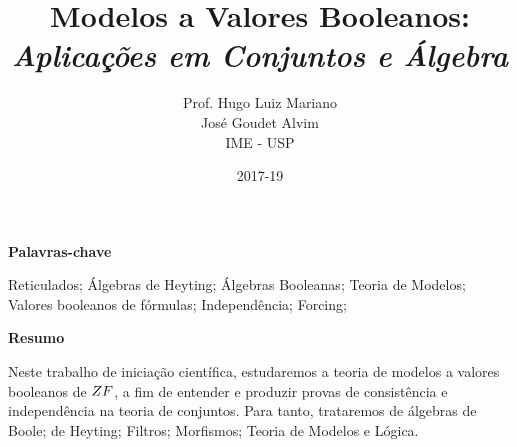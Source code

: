 \documentclass[12pt]{report}
\title{{\bf Modelos a Valores Booleanos:}\\ \em Aplicações em Conjuntos e Álgebra}
\author{
    {\large  Prof.  Hugo Luiz Mariano}\\
                    José Goudet Alvim\\
    IME - USP
}
\date{2017-19}
\begin{document}
    \maketitle
    \justify
    \begin{center}{\bf Palavras-chave}\end{center}
        Reticulados; Álgebras de Heyting; Álgebras Booleanas; 
        Teoria de Modelos; Valores booleanos de fórmulas; 
        Independência; Forcing;
    \begin{center}{\bf Resumo}\end{center}
        Neste trabalho de iniciação científica, estudaremos 
        a teoria de modelos a valores booleanos de $\sc ZF$, 
        a fim de entender e produzir provas de consistência 
        e independência na teoria de conjuntos. Para tanto, 
        trataremos de álgebras de Boole; de Heyting; Filtros; 
        Morfismos; Teoria de Modelos e Lógica.
    \cls
    
    \tableofcontents
    \cls
    
    
\end{document}

